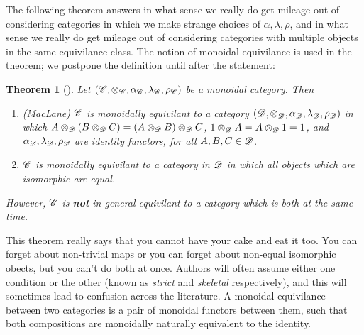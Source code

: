 \documentclass{article}
\newtheorem{theorem}{Theorem}[section]
\theoremstyle{definition}
\numberwithin{figure}{section}
\begin{document}
The following theorem answers in what sense we really do get mileage out of considering categories in which we make strange choices of $\alpha,\lambda,\rho$, and in what sense we really do get mileage out of considering categories with multiple objects in the same equivilance class. The notion of monoidal equivilance is used in the theorem; we postpone the definition until after the statement:

\begin{theorem}[\cite{hagge2009some}] Let $(\mathscr{C},\otimes_{\mathscr{C}},\alpha_{\mathscr{C}},\lambda_{\mathscr{C}},\rho_{\mathscr{C}})$ be a monoidal category. Then

\begin{enumerate}
\item (MacLane)  $\mathscr{C}$ is monoidally equivilant to a category $(\mathscr{D},\otimes_{\mathscr{D}},\alpha_{\mathscr{D}},\lambda_{\mathscr{D}},\rho_{\mathscr{D}})$ in which $A\otimes_{\mathscr{D}} (B\otimes_{\mathscr{D}} C)=(A\otimes_{\mathscr{D}} B)\otimes_{\mathscr{D}} C$, $1\otimes_{\mathscr{D}} A=A\otimes_{\mathscr{D}} 1=1$, and $\alpha_{\mathscr{D}},\lambda_{\mathscr{D}},\rho_{\mathscr{D}}$ are identity functors, for all $A,B,C\in \mathscr{D}$. 
\item $\mathscr{C}$ is monoidally equivilant to a category in $\mathscr{D}$ in which all objects which are isomorphic are equal.
\end{enumerate}

However, $\mathscr{C}$ is \textbf{not} in general equivilant to a category which is both at the same time.
\end{theorem}

This theorem really says that you cannot have your cake and eat it too. You can forget about non-trivial maps or you can forget about non-equal isomorphic obects, but you can't do both at once. Authors will often assume either one condition or the other (known as \textit{strict} and \textit{skeletal} respectively), and this will sometimes lead to confusion across the literature. A monoidal equivilance between two categories is a pair of monoidal functors between them, such that both compositions are monoidally naturally equivalent to the identity.
\end{document}

